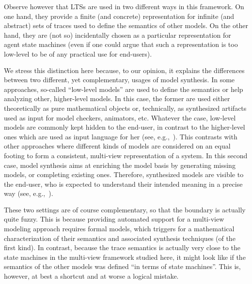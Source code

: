 Observe however that LTSs are used in two different ways in this framework. On one hand, they provide a finite (and concrete) representation for infinite (and abstract) sets of traces used to define the semantics of other models. On the other hand, they are (not so) incidentally chosen as a particular representation for agent state machines (even if one could argue that such a representation is too low-level to be of any practical use for end-users). 

We stress this distinction here because, to our opinion, it explains the differences between two different, yet complementary, usages of model synthesis. In some approaches, so-called ``low-level models'' are used to define the semantics or help analyzing other, higher-level models. In this case, the former are used either theoretically as pure mathematical objects or, technically, as synthesized artifacts used as input for model checkers, animators, etc. Whatever the case, low-level models are commonly kept hidden to the end-user, in contrast to the higher-level ones which are used as input language for her (see, e.g.,~\cite{Magee:1997, Uchitel:2003, Damas:2009}). This contrasts with other approaches where different kinds of models are considered on an equal footing to form a consistent, multi-view representation of a system. In this second case, model synthesis aims at enriching the model basis by generating missing models, or completing existing ones. Therefore, synthesized models are visible to the end-user, who is expected to understand their intended meaning in a precise way (see, e.g.,~\cite{VanLamsweerde:1998, Whittle:2000, Uchitel:2004, Damas:2005}).

These two settings are of course complementary, so that the boundary is actually quite fuzzy. This is because providing automated support for a multi-view modeling approach requires formal models, which triggers for a mathematical characterization of their semantics and associated synthesis techniques (of the first kind). In contrast, because the trace semantics is actually very close to the state machines in the multi-view framework studied here, it might look like if the semantics of the other models was defined ``in terms of state machines''. This is, however, at best a shortcut and at worse a logical mistake.

